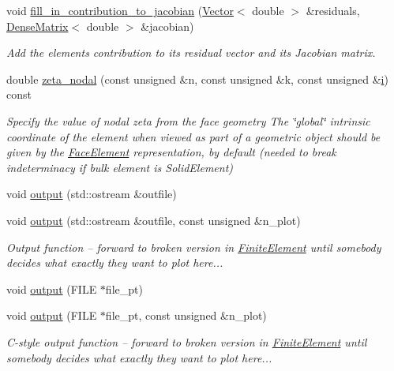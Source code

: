 \begin{DoxyCompactItemize}
void \hyperlink{classoomph_1_1PMLHelmholtzFluxElement_a1d3dd847de79b9758b9bdd40dcbcda3c}{fill\+\_\+in\+\_\+contribution\+\_\+to\+\_\+jacobian} (\hyperlink{classoomph_1_1Vector}{Vector}$<$ double $>$ \&residuals, \hyperlink{classoomph_1_1DenseMatrix}{Dense\+Matrix}$<$ double $>$ \&jacobian)
\begin{DoxyCompactList}\small\item\em Add the element\textquotesingle{}s contribution to its residual vector and its Jacobian matrix. \end{DoxyCompactList}\item 
double \hyperlink{classoomph_1_1PMLHelmholtzFluxElement_a660d5d2b8d4b49a504b0f6c95348891a}{zeta\+\_\+nodal} (const unsigned \&n, const unsigned \&k, const unsigned \&\hyperlink{cfortran_8h_adb50e893b86b3e55e751a42eab3cba82}{i}) const
\begin{DoxyCompactList}\small\item\em Specify the value of nodal zeta from the face geometry The \char`\"{}global\char`\"{} intrinsic coordinate of the element when viewed as part of a geometric object should be given by the \hyperlink{classoomph_1_1FaceElement}{Face\+Element} representation, by default (needed to break indeterminacy if bulk element is Solid\+Element) \end{DoxyCompactList}\item 
void \hyperlink{classoomph_1_1PMLHelmholtzFluxElement_af8956e992516fb436d9f0947ac95d894}{output} (std\+::ostream \&outfile)
\item 
void \hyperlink{classoomph_1_1PMLHelmholtzFluxElement_a35c5a4002aa8752b2d44e6c9abc9e6bd}{output} (std\+::ostream \&outfile, const unsigned \&n\+\_\+plot)
\begin{DoxyCompactList}\small\item\em Output function -- forward to broken version in \hyperlink{classoomph_1_1FiniteElement}{Finite\+Element} until somebody decides what exactly they want to plot here... \end{DoxyCompactList}\item 
void \hyperlink{classoomph_1_1PMLHelmholtzFluxElement_ac4961df891c00c8f49fc804953c981ce}{output} (F\+I\+LE $\ast$file\+\_\+pt)
\item 
void \hyperlink{classoomph_1_1PMLHelmholtzFluxElement_a30d82efbe15fe325f127ea5028fefc0b}{output} (F\+I\+LE $\ast$file\+\_\+pt, const unsigned \&n\+\_\+plot)
\begin{DoxyCompactList}\small\item\em C-\/style output function -- forward to broken version in \hyperlink{classoomph_1_1FiniteElement}{Finite\+Element} until somebody decides what exactly they want to plot here... \end{DoxyCompactList}\item 

\end{DoxyCompactItemize}
